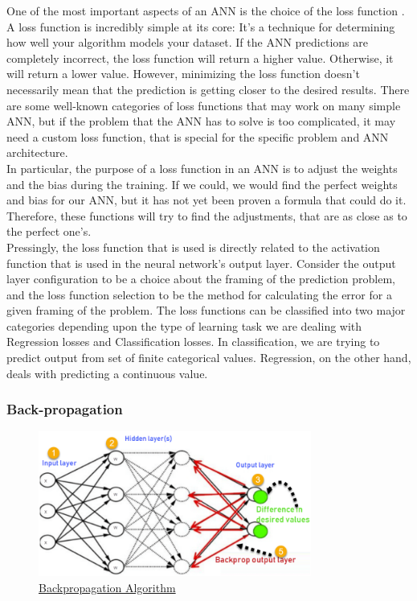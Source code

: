One of the most important aspects of an ANN is the choice of the loss function \cite{The importance of the loss function in option valuation} . A loss function is incredibly simple at its core: It's a technique for determining how well your algorithm models your dataset. If the ANN predictions are completely incorrect, the loss function will return a higher value. Otherwise, it will return a lower value. However, minimizing the loss function doesn't necessarily mean that the prediction is getting closer to the desired results. There are some well-known categories of loss functions that may work on many simple ANN, but if the problem that the ANN has to solve is too complicated, it may need a custom loss function, that is special for the specific problem and ANN architecture. \\

In particular, the purpose of a loss function in an ANN is to adjust the weights and the bias during the training. If we could, we would find the perfect weights and bias for our ANN, but it has not yet been proven a formula that could do it. Therefore, these functions will try to find the adjustments, that are as close as to the perfect one's. \\

Pressingly, the loss function that is used is directly related to the activation function that is used in the neural network's output layer. Consider the output layer configuration to be a choice about the framing of the prediction problem, and the loss function selection to be the method for calculating the error for a given framing of the problem. The loss functions can be classified into two major categories depending upon the type of learning task we are dealing with Regression losses and Classification losses. In classification, we are trying to predict output from set of finite categorical values. Regression, on the other hand, deals with predicting a continuous value.

\subsubsection*{Back-propagation}

 \begin{figure}[h]
	\centering
	\includegraphics[width=0.8\textwidth]{figures/background/Backpropagation.png}
	\captionsetup{labelformat=empty}
	\caption{\href{https://www.guru99.com/images/1/030819_0937_BackPropaga1.png}
	{Backpropagation Algorithm}}
\end{figure}


